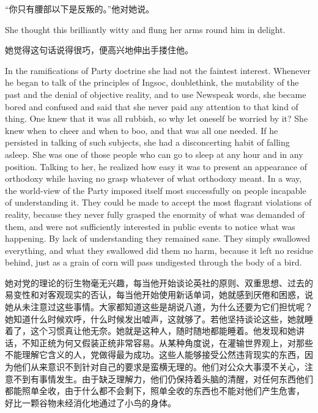\begin{paracol}{2}
\switchcolumn

``你只有腰部以下是反叛的。''他对她说。

\switchcolumn*

She thought this brilliantly witty and flung her arms round him in
delight.

\switchcolumn

她觉得这句话说得很巧，便高兴地伸出手搂住他。

\switchcolumn*

In the ramifications of Party doctrine she had not the faintest
interest. Whenever he began to talk of the principles of Ingsoc,
doublethink, the mutability of the past and the denial of objective
reality, and to use Newspeak words, she became bored and confused and
said that she never paid any attention to that kind of thing. One knew
that it was all rubbish, so why let oneself be worried by it? She knew
when to cheer and when to boo, and that was all one needed. If he
persisted in talking of such subjects, she had a disconcerting habit of
falling asleep. She was one of those people who can go to sleep at any
hour and in any position. Talking to her, he realized how easy it was to
present an appearance of orthodoxy while having no grasp whatever of
what orthodoxy meant. In a way, the world-view of the Party imposed
itself most successfully on people incapable of understanding it. They
could be made to accept the most flagrant violations of reality, because
they never fully grasped the enormity of what was demanded of them, and
were not sufficiently interested in public events to notice what was
happening. By lack of understanding they remained sane. They simply
swallowed everything, and what they swallowed did them no harm, because
it left no residue behind, just as a grain of corn will pass undigested
through the body of a bird.

\switchcolumn

她对党的理论的衍生物毫无兴趣，每当他开始谈论英社的原则、双重思想、过去的易变性和对客观现实的否认，每当他开始使用新话单词，她就感到厌倦和困惑，说她从未注意过这些事情。大家都知道这些是胡说八道，为什么还要为它们担忧呢？她知道什么时候欢呼，什么时候发出嘘声，这就够了。若他坚持谈论这些，她就睡着了，这个习惯真让他无奈。她就是这种人，随时随地都能睡着。他发现和她讲话，不知正统为何又假装正统非常容易。从某种角度说，在灌输世界观上，对那些不能理解它含义的人，党做得最为成功。这些人能够接受公然违背现实的东西，因为他们从来意识不到针对自己的要求是蛮横无理的。他们对公众大事漠不关心，注意不到有事情发生。由于缺乏理解力，他们仍保持着头脑的清醒，对任何东西他们都能照单全收，由于什么都不会剩下，照单全收的东西也不能对他们产生危害，
好比一颗谷物未经消化地通过了小鸟的身体。


\end{paracol}
